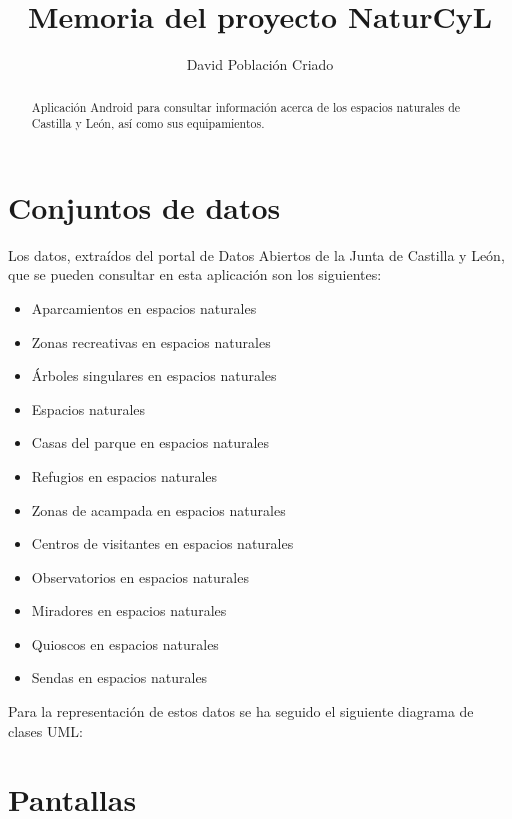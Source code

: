 \documentclass[a4paper]{article}
\title{Memoria del proyecto NaturCyL}
\author{David Población Criado\\
}
\begin{document}
\maketitle

\begin{abstract}
Aplicación Android para consultar información acerca de los espacios naturales de Castilla y León, así como sus equipamientos.
\end{abstract}

\section{Conjuntos de datos}
Los datos, extraídos del portal de Datos Abiertos de la Junta de Castilla y León, que se pueden consultar en esta aplicación son los siguientes:
\begin{itemize}
	\item Aparcamientos en espacios naturales
        \item Zonas recreativas en espacios naturales
        \item Árboles singulares en espacios naturales
        \item Espacios naturales
        \item Casas del parque en espacios naturales
        \item Refugios en espacios naturales
        \item Zonas de acampada en espacios naturales
        \item Centros de visitantes en espacios naturales
        \item Observatorios en espacios naturales
        \item Miradores en espacios naturales
        \item Quioscos en espacios naturales
        \item Sendas en espacios naturales
\end{itemize}

Para la representación de estos datos se ha seguido el siguiente diagrama de clases UML:

\section{Pantallas}
\end{document}

